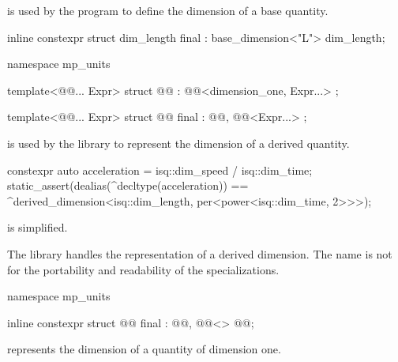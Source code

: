 \pnum
{} is used by the program
to define the dimension of a base quantity.
\begin{example}
\begin{codeblock}
inline constexpr struct dim_length final : base_dimension<"L"> {} dim_length;
\end{codeblock}
\end{example}

\begin{codeblock}
namespace mp_units {

template<@@... Expr>
struct @@ : @@<dimension_one, Expr...> {};

template<@@... Expr>
struct @@ final : @@, @@<Expr...> {};

}
\end{codeblock}

\pnum
{} is used by the library
to represent the dimension of a derived quantity.
\begin{example}
\begin{codeblock}
constexpr auto acceleration = isq::dim_speed / isq::dim_time;
static_assert(dealias(^decltype(acceleration)) ==
              ^derived_dimension<isq::dim_length, per<power<isq::dim_time, 2>>>);
\end{codeblock}
\end{example}

\pnum
\mandates
{} is simplified.
\begin{note}
The library handles the representation of a derived dimension.
The name is not \expos{} for the portability and readability of the specializations.
\end{note}

\begin{codeblock}
namespace mp_units {

inline constexpr struct @@ final : @@, @@<> {
} @@;

}
\end{codeblock}

\pnum
{} represents the dimension of a quantity of dimension one.

